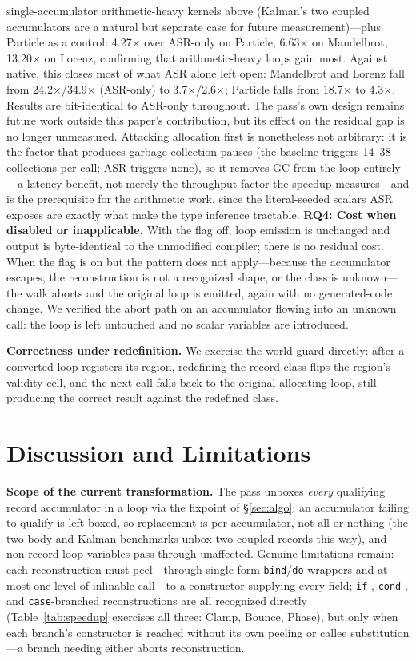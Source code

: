 \documentclass[sigplan,screen,review,anonymous]{acmart}
\begin{document}
single-accumulator arithmetic-heavy kernels above (Kalman's two coupled
accumulators are a natural but separate case for future measurement)---plus
Particle as a control: 4.27$\times$ over ASR-only on Particle, 6.63$\times$
on Mandelbrot, 13.20$\times$ on Lorenz, confirming that arithmetic-heavy
loops gain most. Against native, this closes most of what ASR alone
left open: Mandelbrot and Lorenz fall from 24.2$\times$/34.9$\times$
(ASR-only) to 3.7$\times$/2.6$\times$; Particle falls from 18.7$\times$ to
4.3$\times$. Results are bit-identical to ASR-only throughout. The pass's
own design remains future work outside this paper's contribution, but
its effect on the residual gap is no longer unmeasured. Attacking allocation first is
nonetheless not arbitrary: it is the factor that produces garbage-collection
pauses (the baseline triggers 14--38 collections per call; ASR triggers none),
so it removes GC from the loop entirely---a latency benefit, not merely the
throughput factor the speedup measures---and is the prerequisite for the
arithmetic work, since the literal-seeded scalars ASR exposes are exactly what
make the type inference tractable.
\textbf{RQ4: Cost when disabled or inapplicable.} With the flag off, loop
emission is unchanged and output is byte-identical to the unmodified
compiler; there is no residual cost. When the flag is on but the pattern does
not apply---because the accumulator escapes, the reconstruction is not a
recognized shape, or the class is unknown---the walk aborts and the original
loop is emitted, again with no generated-code change. We verified the
abort path on an accumulator flowing into an unknown call: the loop is left
untouched and no scalar variables are introduced.

\textbf{Correctness under redefinition.} We exercise the world guard directly:
after a converted loop registers its region, redefining the record class flips
the region's validity cell, and the next call falls back to the original
allocating loop, still producing the correct result against the redefined
class.

\section{Discussion and Limitations}
\label{sec:discussion}

\textbf{Scope of the current transformation.} The pass unboxes \emph{every}
qualifying record accumulator in a loop via the fixpoint of \S\ref{sec:algo};
an accumulator failing to qualify is left boxed, so replacement is
per-accumulator, not all-or-nothing (the two-body and Kalman benchmarks
unbox two coupled records this way), and non-record loop variables pass
through unaffected. Genuine limitations remain: each reconstruction must
peel---through single-form \texttt{bind}/\texttt{do} wrappers and at most
one level of inlinable call---to a constructor supplying every field;
\texttt{if}-, \texttt{cond}-, and \texttt{case}-branched reconstructions
are all recognized directly (Table~\ref{tab:speedup} exercises all three:
Clamp, Bounce, Phase), but only when each branch's constructor is reached
without its own peeling or callee substitution---a branch needing either
aborts reconstruction.
\end{document}
